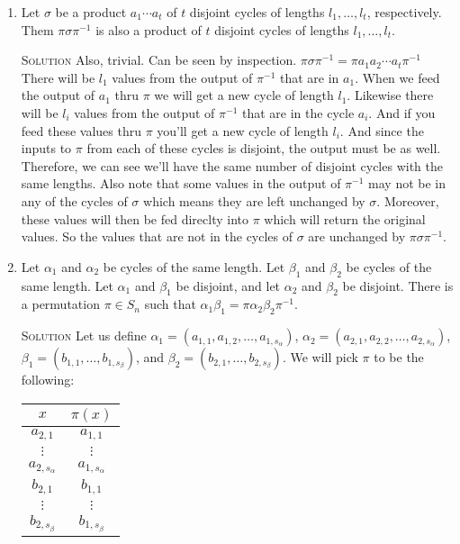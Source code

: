 \documentclass[twoside]{amsart}
\newcommand{\solution}{\textsc{Solution}\xspace}
\begin{document}
\begin{enumerate}[A.]
\begin{enumerate}[1]
       \item Let $\sigma$ be a product $a_1 \cdots a_t$ of $t$ disjoint cycles
       of lengths $l_1,\dots,l_t$, respectively. Them $\pi\sigma\pi^{-1}$
       is also a product of $t$ disjoint cycles of lengths $l_1,\dots,l_t$.

       \noindent \solution Also, trivial. Can be seen by inspection.
       $\pi\sigma\pi^{-1}=\pi a_1 a_2 \cdots a_t \pi^{-1}$ There will
       be $l_1$ values from the output of $\pi^{-1}$ that are in $a_1$.
       When we feed the output of $a_1$ thru $\pi$ we will get a new
       cycle of length $l_1$.
       Likewise there will be $l_i$ values from the output of $\pi^{-1}$
       that are in the cycle $a_i$. And if you feed these values thru
       $\pi$ you'll get a new cycle of length $l_i$. And since the inputs
       to $\pi$ from each of these cycles is disjoint, the output must
       be as well. Therefore, we can see we'll have the same number of
       disjoint cycles with the same lengths. Also note that some
       values in the output of $\pi^{-1}$ may not be in any of the cycles of
       $\sigma$ which means they are left unchanged by $\sigma$. Moreover,
       these values will then be fed direclty into $\pi$ which will
       return the original values. So the values that are not in the
       cycles of $\sigma$ are unchanged by $\pi\sigma\pi^{-1}$.

       \item Let $\alpha_1$ and $\alpha_2$ be cycles of the same length.
       Let $\beta_1$ and $\beta_2$ be cycles of the same length. Let $\alpha_1$
       and $\beta_1$ be disjoint, and let $\alpha_2$ and $\beta_2$ be 
       disjoint. There is a permutation $\pi \in S_n$ such that
       $\alpha_1 \beta_1 = \pi \alpha_2 \beta_2 \pi^{-1}$.

       \noindent \solution Let us define $\alpha_1 = (a_{1,1}, a_{1,2}, 
       \ldots , a_{1,s_\alpha})$, $\alpha_2 = (a_{2,1}, a_{2,2},
       \ldots, a_{2,s_\alpha})$, $\beta_1 = (b_{1,1}, \ldots , 
       b_{1,s_\beta})$, and $\beta_2 = (b_{2,1}, \ldots, b_{2,s_\beta})$.
       We will pick $\pi$ to be the following:

       \begin{center}
       \begin{tabular}{c|c}
          $x$              &   $\pi(x)$         \\ \hline
          $a_{2,1}$        &   $a_{1,1}$        \\
          $\vdots$         &   $\vdots$         \\
          $a_{2,s_\alpha}$ &   $a_{1,s_\alpha}$ \\
          $b_{2,1}$        &   $b_{1,1}$        \\
          $\vdots$         &   $\vdots$         \\
          $b_{2,s_\beta}$ &   $b_{1,s_\beta}$ \\
       \end{tabular}
       \end{center}


\end{enumerate}
\end{enumerate}
\end{document}
